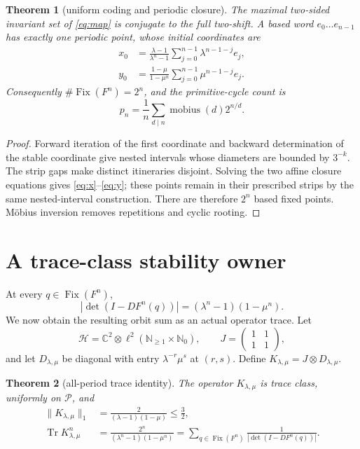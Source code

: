 \documentclass[11pt]{article}
\newtheorem{theorem}{Theorem}
\newcommand{\Fix}{\operatorname{Fix}}
\newcommand{\Tr}{\operatorname{Tr}}
\begin{document}
\begin{theorem}[uniform coding and periodic closure]\label{thm:coding}
The maximal two-sided invariant set of \eqref{eq:map} is conjugate to the
full two-shift.  A based word $e_0\ldots e_{n-1}$ has exactly one periodic
point, whose initial coordinates are
\begin{align}
 x_0&=\frac{\lambda-1}{\lambda^n-1}
       \sum_{j=0}^{n-1}\lambda^{n-1-j}e_j,\label{eq:x}\\
 y_0&=\frac{1-\mu}{1-\mu^n}
       \sum_{j=0}^{n-1}\mu^{n-1-j}e_j.\label{eq:y}
\end{align}
Consequently $\#\Fix(F^n)=2^n$, and the primitive-cycle count is
\[
 p_n=\frac1n\sum_{d\mid n}\operatorname{mobius}(d)2^{n/d}.
\]
\end{theorem}

\begin{proof}
Forward iteration of the first coordinate and backward determination of the
stable coordinate give nested intervals whose diameters are bounded by
$3^{-k}$.  The strip gaps make distinct itineraries disjoint.  Solving the
two affine closure equations gives \eqref{eq:x}--\eqref{eq:y}; these points
remain in their prescribed strips by the same nested-interval construction.
There are therefore $2^n$ based fixed points.  M\"obius inversion removes
repetitions and cyclic rooting.
\end{proof}

\section{A trace-class stability owner}

At every $q\in\Fix(F^n)$,
\[
 |\det(I-DF^n(q))|=(\lambda^n-1)(1-\mu^n).
\]
We now obtain the resulting orbit sum as an actual operator trace.  Let
\[
 \mathcal H=\mathbb C^2\otimes
 \ell^2(\mathbb N_{\ge1}\times\mathbb N_0),\qquad
 J=\begin{pmatrix}1&1\\1&1\end{pmatrix},
\]
and let $D_{\lambda,\mu}$ be diagonal with entry
$\lambda^{-r}\mu^s$ at $(r,s)$.  Define
$K_{\lambda,\mu}=J\otimes D_{\lambda,\mu}$.

\begin{theorem}[all-period trace identity]\label{thm:trace}
The operator $K_{\lambda,\mu}$ is trace class, uniformly on $\mathcal P$,
and
\begin{align}
 \|K_{\lambda,\mu}\|_1
 &=\frac{2}{(\lambda-1)(1-\mu)}\le\frac32,\label{eq:norm}\\
 \Tr K_{\lambda,\mu}^n
 &=\frac{2^n}{(\lambda^n-1)(1-\mu^n)}
 =\sum_{q\in\Fix(F^n)}\frac1{|\det(I-DF^n(q))|}.
 \label{eq:trace}
\end{align}
\end{theorem}
\end{document}
